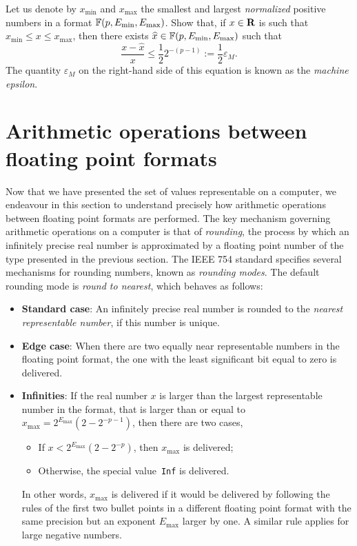 \begin{exercise}
    Let us denote by $x_{\min}$ and $x_{\max}$ the smallest and largest \emph{normalized} positive numbers in a format $\mathbb F(p, E_{\min}, E_{\max})$.
    Show that, if $x \in \mathbf R$ is such that $x_{\min} \leq x \leq x_{\max}$,
    then there exists $\widehat x \in \mathbb F(p, E_{\min}, E_{\max})$ such that
    \[
        \frac{x - \widehat x}{x} \leq \frac{1}{2} 2^{-(p-1)} := \frac{1}{2} \varepsilon_M.
    \]
    The quantity $\varepsilon_M$ on the right-hand side of this equation is known as the \emph{machine epsilon}.
\end{exercise}

\section{Arithmetic operations between floating point formats}%
\label{sec:arithmetic_operations_between_floating_point_formats}

Now that we have presented the set of values representable on a computer,
we endeavour in this section to understand precisely how arithmetic operations between floating point formats are performed.
The key mechanism governing arithmetic operations on a computer is that of \emph{rounding},
the process by which an infinitely precise real number is approximated by a floating point number of the type presented in the previous section.
The IEEE 754 standard specifies several mechanisms for rounding numbers,
known as \emph{rounding modes}.
The default rounding mode is \emph{round to nearest},
which behaves as follows:
\begin{itemize}
    \item
        \textbf{Standard case}:
        An infinitely precise real number is rounded to the \emph{nearest representable number},
        if this number is unique.
    \item
        \textbf{Edge case}:
        When there are two equally near representable numbers in the floating point format,
        the one with the least significant bit equal to zero is delivered.
    \item
        \textbf{Infinities}:
        If the real number $x$ is larger than the largest representable number in the format,
        that is larger than or equal to $x_{\max} = 2^{E_{\max}} (2 - 2^{-p-1})$,
        then there are two cases,
        \begin{itemize}
            \item If $x < 2^{E_{\max}} (2 - 2^{-p})$, then $x_{\max}$ is delivered;
            \item Otherwise, the special value~\texttt{Inf} is delivered.
        \end{itemize}
        In other words, $x_{\max}$ is delivered if it would be delivered by following the rules of the first two bullet points
        in a different floating point format with the same precision but an exponent $E_{\max}$ larger by one.
        A similar rule applies for large negative numbers.
\end{itemize}

